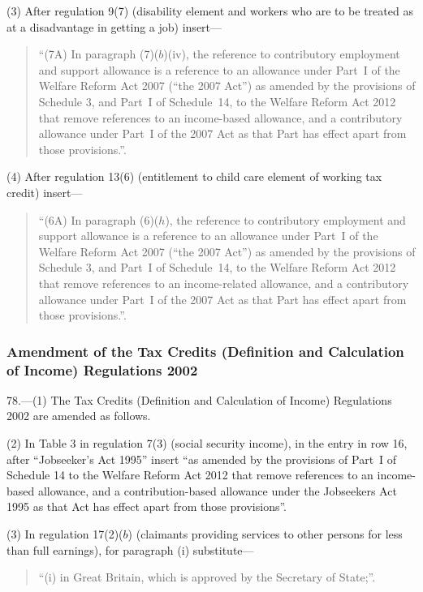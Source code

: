 \documentclass[12pt,a4paper]{article}
\begin{document}
(3) After regulation 9(7) (disability element and workers who are to be treated as at a disadvantage in getting a job) insert—
\begin{quotation}
“(7A) In paragraph (7)($b$)(iv), the reference to contributory employment and support allowance is a reference to an allowance under Part~I of the Welfare Reform Act 2007 (“the 2007 Act”) as amended by the provisions of Schedule 3, and Part~I of Schedule~14, to the Welfare Reform Act 2012 that remove references to an income-based allowance, and a contributory allowance under Part~I of the 2007 Act as that Part has effect apart from those provisions.”.
\end{quotation}

(4) After regulation 13(6) (entitlement to child care element of working tax credit) insert—
\begin{quotation}
“(6A) In paragraph (6)($h$), the reference to contributory employment and support allowance is a reference to an allowance under Part~I of the Welfare Reform Act 2007 (“the 2007 Act”) as amended by the provisions of Schedule 3, and Part~I of Schedule~14, to the Welfare Reform Act 2012 that remove references to an income-related allowance, and a contributory allowance under Part~I of the 2007 Act as that Part has effect apart from those provisions.”.
\end{quotation}

\subsubsection[78. Amendment of the Tax Credits (Definition and Calculation of Income) Regulations 2002]{Amendment of the Tax Credits (Definition and Calculation of Income) Regulations 2002}

78.—(1) The Tax Credits (Definition and Calculation of Income) Regulations 2002 are amended as follows.

(2) In Table 3 in regulation 7(3) (social security income), in the entry in row 16, after “Jobseeker’s Act 1995” insert “as amended by the provisions of Part~I of Schedule 14 to the Welfare Reform Act 2012 that remove references to an income-based allowance, and a contribution-based allowance under the Jobseekers Act 1995 as that Act has effect apart from those provisions”.

(3) In regulation 17(2)($b$)  (claimants providing services to other persons for less than full earnings), for paragraph (i)  substitute—
\begin{quotation}
“(i) in Great Britain, which is approved by the Secretary of State;”.
\end{quotation}
\end{document}
